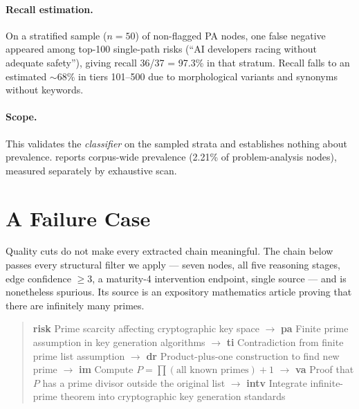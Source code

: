 \documentclass[10pt,twocolumn,letterpaper]{article}
\begin{document}
\paragraph{Recall estimation.} On a stratified sample ($n{=}50$) of non-flagged
PA nodes, one false negative appeared among top-100 single-path risks (``AI
developers racing without adequate safety''), giving recall 36/37 = 97.3\% in
that stratum. Recall falls to an estimated $\sim$68\% in tiers 101--500 due to
morphological variants and synonyms without keywords.

\paragraph{Scope.} This validates the \emph{classifier} on the sampled strata and
establishes nothing about prevalence.  reports corpus-wide
prevalence (2.21\% of problem-analysis nodes), measured separately by exhaustive
scan.

\section{A Failure Case}
\label{app:failure}

Quality cuts do not make every extracted chain meaningful. The chain below passes
every structural filter we apply --- seven nodes, all five reasoning stages, edge
confidence $\geq 3$, a maturity-4 intervention endpoint, single source --- and is
nonetheless spurious. Its source is an expository mathematics article proving
that there are infinitely many primes.

\begin{quote}\small
\textbf{risk} Prime scarcity affecting cryptographic key space $\rightarrow$
\textbf{pa} Finite prime assumption in key generation algorithms $\rightarrow$
\textbf{ti} Contradiction from finite prime list assumption $\rightarrow$
\textbf{dr} Product-plus-one construction to find new prime $\rightarrow$
\textbf{im} Compute $P = \prod(\text{all known primes}) + 1$ $\rightarrow$
\textbf{va} Proof that $P$ has a prime divisor outside the original list
$\rightarrow$ \textbf{intv} Integrate infinite-prime theorem into cryptographic
key generation standards
\end{quote}
\end{document}
